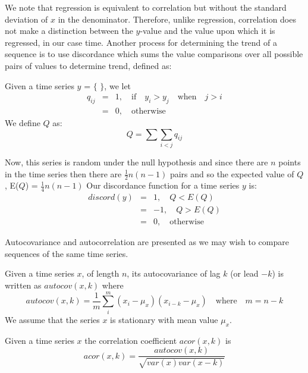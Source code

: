 We note that regression is equivalent to correlation but without
the standard deviation of $x$ in the denominator. Therefore, unlike
regression, 
correlation does not make a distinction between the $y$-value and the
value upon which it is regressed, in our case time. Another process
for determining the trend of a sequence is to use discordance which
sums the value comparisons over all possible pairs of values to
determine trend, defined as: 
 
\begin{definition}\label{def:disccoef}
\begin{rm}
Given a time series $y$ = $\{$  $\}$, we let
\begin{eqnarray*}
q_{ij} & = & 1, \quad\mbox{if}\quad y_i > y_j \quad\mbox{when}\quad j > i \\
       & = & 0, \quad\mbox{otherwise}
\end{eqnarray*}
We define $Q$ as:
\[
Q = \sum \sum_{\!\!\!\!\!\!\!\!\!\!\!i < j} q_{ij}
\]

Now, this series is random under the null hypothesis and since there
are $n$ points in the time series then there are $\frac{1}{2} n(n-1)$
pairs and so the expected value of $Q$, E($Q$) = $\frac{1}{4} n(n-1)$
Our discordance function for a time series $y$ is:
\begin{eqnarray*}
discord(y) & = & 1,  \quad Q < E(Q) \\
      	   & = & -1, \quad Q > E(Q) \\
	   & = & 0,  \quad \mbox{otherwise} 
\end{eqnarray*}
\end{rm}
\end{definition}

Autocovariance and autocorrelation are presented as we may wish to
compare sequences of the same time series.
\begin{definition}[Autocovariance]\label{def:autocovar}
\begin{rm}
Given a time series $x$, of length $n$, its autocovariance of lag $k$
(or lead $-k$) is written as $autocov(x,k)$ where
\[
autocov(x,k) = \frac{1}{m} \sum_i^m (x_i - \mu_x) (x_{i-k} -
\mu_{x})\quad\mbox{where}\quad m = n-k 
\]
We assume that the series $x$ is stationary with mean value $\mu_x$.
\end{rm}
\end{definition}

\begin{definition}\label{def:autocorrel}
\begin{rm}
Given a time series $x$ the correlation coefficient $acor(x,k)$ is
\[
acor(x,k) = \frac{autocov(x,k)}{\sqrt{var(x)var(x-k)}}
\]
\end{rm}
\end{definition}

